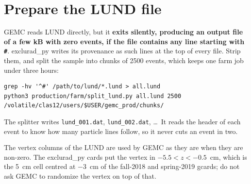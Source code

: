 \documentclass[11pt]{article}
\begin{document}
\section{Prepare the LUND file}
GEMC reads LUND directly, but it \textbf{exits silently, producing an output file of a few kB with
zero events, if the file contains any line starting with \texttt{\#}}. exclurad\_py writes its
provenance as such lines at the top of every file. Strip them, and split the sample into chunks
of 2500 events, which keeps one farm job under three hours:
\begin{lstlisting}
grep -hv '^#' /path/to/lund/*.lund > all.lund
python3 production/farm/split_lund.py all.lund 2500 /volatile/clas12/users/$USER/gemc_prod/chunks/
\end{lstlisting}
The splitter writes \texttt{lund\_001.dat}, \texttt{lund\_002.dat}, \dots\ It reads the header of each
event to know how many particle lines follow, so it never cuts an event in two.

The vertex columns of the LUND are used by GEMC as they are when they are non-zero. The exclurad\_py
cards put the vertex in $-5.5 < z < -0.5$~cm, which is the 5~cm cell centred at $-3$~cm of the
fall-2018 and spring-2019 gcards; do not ask GEMC to randomize the vertex on top of that.
\end{document}
